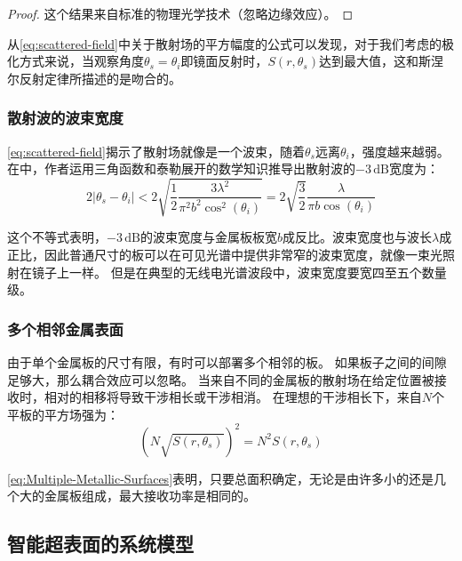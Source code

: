 \documentclass[supercite]{HustGraduPaper}
\begin{document}
\begin{proof}
	这个结果来自标准的物理光学技术（忽略边缘效应）\cite{balanis2012advanced}。
\end{proof}

从\autoref{eq:scattered-field}中关于散射场的平方幅度的公式可以发现，对于我们考虑的极化方式来说，当观察角度$\theta_{s}=\theta_{i}$即镜面反射时，$S\left(r, \theta_{s}\right)$达到最大值，这和斯涅尔反射定律所描述的是吻合的。

\subsubsection{散射波的波束宽度}

\autoref{eq:scattered-field}揭示了散射场就像是一个波束，随着$\theta_{s}$远离$\theta_{i}$，强度越来越弱。在中，作者运用三角函数和泰勒展开的数学知识推导出散射波的$-3\,\mathrm{dB}$宽度为：
\begin{equation}
	2\left|\theta_{s}-\theta_{i}\right|<2\sqrt{\frac{1}{2} \frac{3 \lambda^{2}}{\pi^{2} b^{2} \cos ^{2}\left(\theta_{i}\right)}}=2\sqrt{\frac{3}{2}} \frac{\lambda}{\pi b \cos \left(\theta_{i}\right)}
\end{equation}

这个不等式表明，$-3\,\mathrm{dB}$的波束宽度与金属板板宽$b$成反比。波束宽度也与波长$\lambda$成正比，因此普通尺寸的板可以在可见光谱中提供非常窄的波束宽度，就像一束光照射在镜子上一样。
但是在典型的无线电光谱波段中，波束宽度要宽四至五个数量级。

\subsubsection{多个相邻金属表面}

由于单个金属板的尺寸有限，有时可以部署多个相邻的板。
如果板子之间的间隙足够大，那么耦合效应可以忽略。
当来自不同的金属板的散射场在给定位置被接收时，相对的相移将导致干涉相长或干涉相消。
在理想的干涉相长下，来自$N$个平板的平方场强为：
\begin{equation}
	\left(N \sqrt{S\left(r, \theta_{s}\right)}\right)^{2}=N^{2} S\left(r, \theta_{s}\right)
	\label{eq:Multiple-Metallic-Surfaces}
\end{equation}

\autoref{eq:Multiple-Metallic-Surfaces}表明，只要总面积确定，无论是由许多小的还是几个大的金属板组成，最大接收功率是相同的。

\subsection{智能超表面的系统模型}
\end{document}
